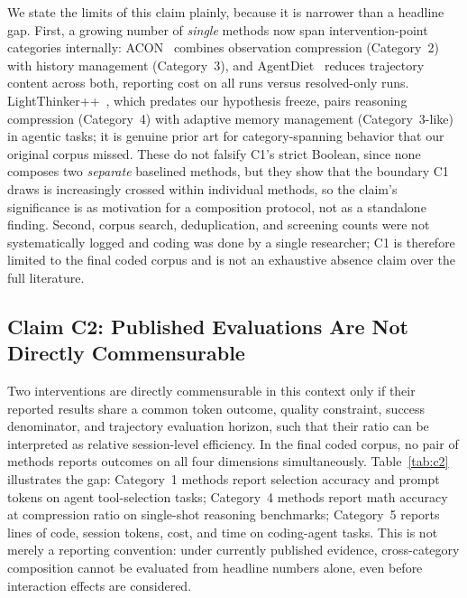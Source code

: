 \documentclass{article}
\begin{document}
We state the limits of this claim plainly, because it is narrower than a headline gap. First, a growing number of \emph{single} methods now span intervention-point categories internally: ACON~\citep{acon2025} combines observation compression (Category~2) with history management (Category~3), and AgentDiet~\citep{agentdiet2025} reduces trajectory content across both, reporting cost on all runs versus resolved-only runs. LightThinker++~\citep{lightthinkerpp2026}, which predates our hypothesis freeze, pairs reasoning compression (Category~4) with adaptive memory management (Category~3-like) in agentic tasks; it is genuine prior art for category-spanning behavior that our original corpus missed. These do not falsify C1's strict Boolean, since none composes two \emph{separate} baselined methods, but they show that the boundary C1 draws is increasingly crossed within individual methods, so the claim's significance is as motivation for a composition protocol, not as a standalone finding. Second, corpus search, deduplication, and screening counts were not systematically logged and coding was done by a single researcher; C1 is therefore limited to the final coded corpus and is not an exhaustive absence claim over the full literature.

\subsection{Claim C2: Published Evaluations Are Not Directly Commensurable}

Two interventions are directly commensurable in this context only if their reported results share a common token outcome, quality constraint, success denominator, and trajectory evaluation horizon, such that their ratio can be interpreted as relative session-level efficiency. In the final coded corpus, no pair of methods reports outcomes on all four dimensions simultaneously. Table~\ref{tab:c2} illustrates the gap: Category~1 methods report selection accuracy and prompt tokens on agent tool-selection tasks; Category~4 methods report math accuracy at compression ratio on single-shot reasoning benchmarks; Category~5 reports lines of code, session tokens, cost, and time on coding-agent tasks. This is not merely a reporting convention: under currently published evidence, cross-category composition cannot be evaluated from headline numbers alone, even before interaction effects are considered.
\end{document}
